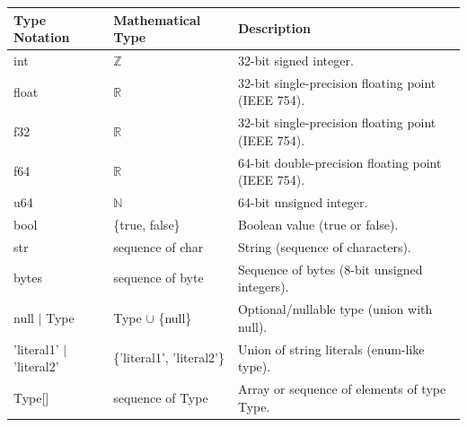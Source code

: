 \documentclass[12pt, titlepage]{article}
\begin{document}
\begin{center}
  \renewcommand{\arraystretch}{1.2}
  \noindent
  \begin{tabular}{l l p{6cm}}
    \toprule
    \textbf{Type Notation}                  & \textbf{Mathematical Type}                    & \textbf{Description}                                                      \\
    \midrule
    int                                     & $\mathbb{Z}$                                  & 32-bit signed integer.                                                    \\
    float                                   & $\mathbb{R}$                                  & 32-bit single-precision floating point (IEEE 754).                        \\
    f32                                     & $\mathbb{R}$                                  & 32-bit single-precision floating point (IEEE 754).                        \\
    f64                                     & $\mathbb{R}$                                  & 64-bit double-precision floating point (IEEE 754).                        \\
    u64                                     & $\mathbb{N}$                                  & 64-bit unsigned integer.                                                  \\
    bool                                    & \{true, false\}                               & Boolean value (true or false).                                            \\
    str                                     & sequence of char                              & String (sequence of characters).                                          \\
    bytes                                   & sequence of byte                              & Sequence of bytes (8-bit unsigned integers).                              \\
    null $|$ Type                           & Type $\cup$ \{null\}                          & Optional/nullable type (union with null).                                 \\
    'literal1' $|$ 'literal2'               & \{'literal1', 'literal2'\}                    & Union of string literals (enum-like type).                                \\
    Type[]                                  & sequence of Type                              & Array or sequence of elements of type Type.                               \\

\end{tabular}
\end{center}
\end{document}

